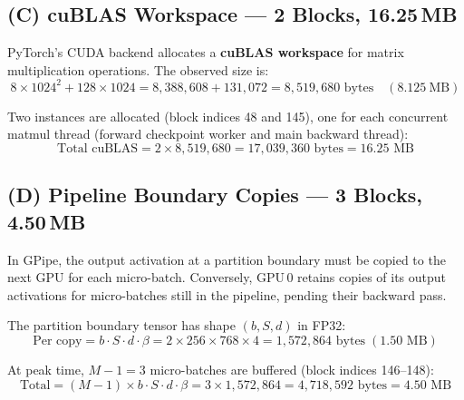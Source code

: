 \documentclass[11pt,a4paper]{article}
\begin{document}
\subsection{(C) cuBLAS Workspace --- 2 Blocks, 16.25\,MB}
\label{sec:cublas}

PyTorch's CUDA backend allocates a \textbf{cuBLAS workspace} for matrix multiplication operations.  The observed size is:
\begin{equation}
  8 \times 1024^{2} + 128 \times 1024 = 8{,}388{,}608 + 131{,}072 = 8{,}519{,}680 \text{~bytes} \quad (8.125~\text{MB})
\end{equation}

Two instances are allocated (block indices 48 and 145), one for each concurrent matmul thread (forward checkpoint worker and main backward thread):
\begin{equation}
  \text{Total cuBLAS} = 2 \times 8{,}519{,}680 = 17{,}039{,}360 \text{~bytes} = 16.25 \text{~MB}
\end{equation}

\subsection{(D) Pipeline Boundary Copies --- 3 Blocks, 4.50\,MB}
\label{sec:pipeline_copy}

In GPipe, the output activation at a partition boundary must be copied to the next GPU for each micro-batch.  Conversely, GPU\,0 retains copies of its output activations for micro-batches still in the pipeline, pending their backward pass.

The partition boundary tensor has shape $(b, S, d)$ in FP32:
\begin{equation}
  \text{Per copy} = b \cdot S \cdot d \cdot \beta = 2 \times 256 \times 768 \times 4 = 1{,}572{,}864 \text{~bytes} \;(1.50 \text{~MB})
\end{equation}

At peak time, $M - 1 = 3$ micro-batches are buffered (block indices 146--148):
\begin{equation}
  \text{Total} = (M - 1) \times b \cdot S \cdot d \cdot \beta = 3 \times 1{,}572{,}864 = 4{,}718{,}592 \text{~bytes} = 4.50 \text{~MB}
\end{equation}
\end{document}
